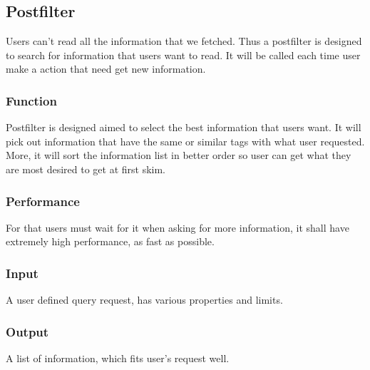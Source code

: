 
\subsection{Postfilter}
  Users can't read all the information that we fetched.
  Thus a postfilter is designed to search for information that users want to read.
  It will be called each time user make a action that need get new information.

  \subsubsection{Function}
    Postfilter is designed aimed to select the best information that users want.
    It will pick out information that have the same or similar tags with what user requested.
    More, it will sort the information list in better order so user can get what they are most desired to get at first skim.

  \subsubsection{Performance}
    For that users must wait for it when asking for more information, it shall have extremely high performance, as fast as possible.

  \subsubsection{Input}
    A user defined query request, has various properties and limits.

  \subsubsection{Output}
    A list of information, which fits user's request well.

